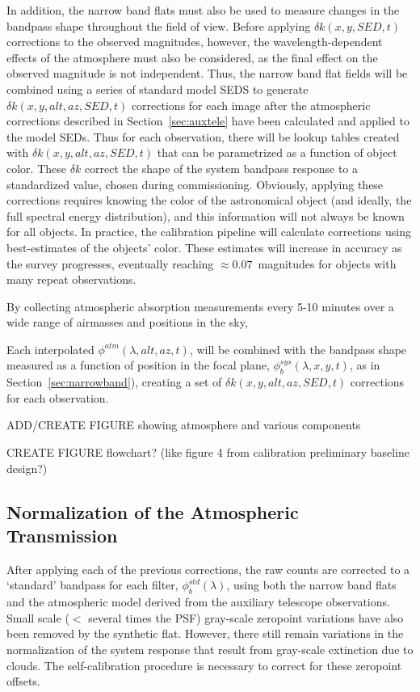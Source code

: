 \documentclass[12pt,preprint]{aastex}
\begin{document}
In addition, the narrow band flats must also be used to measure
changes in the bandpass shape throughout the field of view. Before
applying $\delta k(x,y,SED,t)$ corrections to the observed magnitudes,
however, the wavelength-dependent effects of the atmosphere must also
be considered, as the final effect on the observed magnitude is not
independent. Thus, the narrow band flat fields will be combined using
a series of standard model SEDS to generate $\delta
k(x,y,alt,az,SED,t)$ corrections for each image after the atmospheric
corrections described in Section~\ref{sec:auxtele} have been
calculated and applied to the model SEDs. Thus for each observation,
there will be lookup tables created with $\delta k(x,y,alt,az,SED,t)$
that can be parametrized as a function of object color. These $\delta
k$ correct the shape of the system bandpass response to a standardized
value, chosen during commissioning.  Obviously, applying these
corrections requires knowing the color of the astronomical object (and
ideally, the full spectral energy distribution), and this information
will not always be known for all objects. In practice, the calibration
pipeline will calculate corrections using best-estimates of the
objects' color. These estimates will increase in accuracy as the
survey progresses, eventually reaching $\approx 0.07$~magnitudes for
objects with many repeat observations.



By collecting atmospheric absorption measurements every 5-10 minutes 
over a wide range of airmasses and positions in the sky, 

Each interpolated $\phi^{atm}(\lambda,alt,az,t)$, will be combined with
the bandpass shape measured as a function of position in the focal
plane, $\phi_b^{sys}(\lambda,x,y,t)$, as in
Section~\ref{sec:narrowband}), creating a set of $\delta
k(x,y,alt,az,SED,t)$ corrections for each observation.

ADD/CREATE FIGURE showing atmosphere and various components

CREATE FIGURE flowchart? (like figure 4 from calibration preliminary
baseline design?)


\subsection{Normalization of the Atmospheric Transmission}
\label{sec:selfcalib}

After applying each of the previous corrections, the raw counts are
corrected to a `standard' bandpass for each filter,
$\phi_b^{std}(\lambda)$, using both the narrow band flats and the
atmospheric model derived from the auxiliary telescope
observations. Small scale ($<$ several times the PSF) gray-scale
zeropoint variations have also been removed by the synthetic
flat. However, there still remain variations in the normalization of the
system response that result from gray-scale extinction due to
clouds. The self-calibration procedure is necessary to correct for
these zeropoint offsets.
\end{document}
